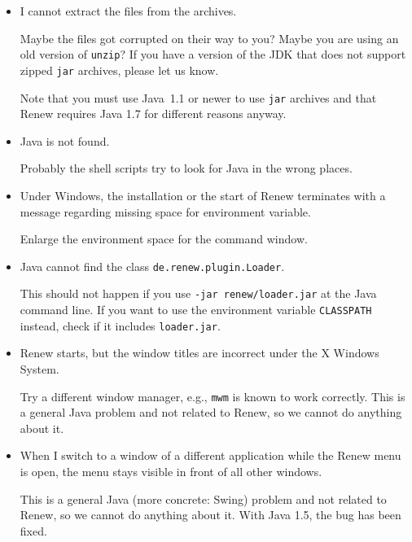 \begin{itemize}
\item I cannot extract the files from the archives.

Maybe the files got corrupted on their way to you?
Maybe you are using an old version of \texttt{unzip}?
If you have a version of the JDK that does not support zipped
\texttt{jar} archives, please let us know.

Note that you must use Java~1.1 or newer to use \texttt{jar} archives
and that Renew requires Java 1.7 for different reasons anyway.

\item Java is not found.

Probably the shell scripts try to look for Java in the wrong places.

\item Under Windows, the installation or the start of Renew
terminates with a message regarding missing space for environment
variable.

Enlarge the environment space for the command window.

\item Java cannot find the class \texttt{de.renew.plugin.Loader}.

This should not happen if you use \texttt{-jar renew\renewversion/loader.jar}
at the Java command line.
If you want to use the environment variable \texttt{CLASSPATH}
instead, check if it includes \texttt{loader.jar}.

\item Renew starts, but the window titles are incorrect under
the X Windows System.

Try a different window manager, e.g., \texttt{mwm} is known to work
correctly.
This is a general Java problem and not related to Renew, so we cannot do
anything about it.

\item When I switch to a window of a different application while the
Renew menu is open, the menu stays visible in front of all other windows.

This is a general Java (more concrete: Swing) problem and not related
to Renew, so we cannot do anything about it.
With Java 1.5, the bug has been fixed.




\end{itemize}
